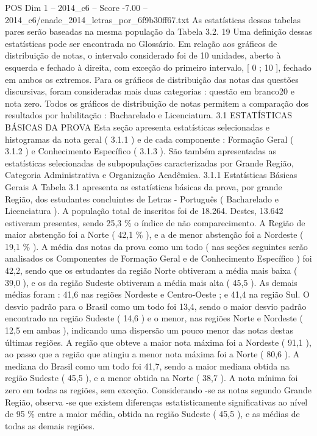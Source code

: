 \begin{textsample}{POS Dim 1 – 2014\_c6 – Score -7.00 – 2014\_c6/enade\_2014\_letras\_por\_6f9b30ff67.txt}
As estatísticas dessas tabelas pares serão baseadas na mesma população da Tabela 3.2. 19 Uma definição dessas estatísticas pode ser encontrada no Glossário.
Em relação aos gráficos de distribuição de notas, o intervalo considerado foi de 10 unidades, aberto à esquerda e fechado à direita, com exceção do primeiro intervalo, [ 0 ; 10 ], fechado em ambos os extremos.
Para os gráficos de distribuição das notas das questões discursivas, foram consideradas mais duas categorias : questão em branco20 e nota zero.
Todos os gráficos de distribuição de notas permitem a comparação dos resultados por habilitação : Bacharelado e Licenciatura. 3.1 ESTATÍSTICAS BÁSICAS DA PROVA Esta seção apresenta estatísticas selecionadas e histogramas da nota geral ( 3.1.1 ) e de cada componente : Formação Geral ( 3.1.2 ) e Conhecimento Específico ( 3.1.3 ).
São também apresentadas as estatísticas selecionadas de subpopulações caracterizadas por Grande Região, Categoria Administrativa e Organização Acadêmica. 3.1.1 Estatísticas Básicas Gerais A Tabela 3.1 apresenta as estatísticas básicas da prova, por grande Região, dos estudantes concluintes de Letras - Português ( Bacharelado e Licenciatura ).
A população total de inscritos foi de 18.264.
Destes, 13.642 estiveram presentes, sendo 25,3 \% o índice de não comparecimento.
A Região de maior abstenção foi a Norte ( 42,1 \% ), e a de menor abstenção foi a Nordeste ( 19,1 \% ).
A média das notas da prova como um todo ( nas seções seguintes serão analisados os Componentes de Formação Geral e de Conhecimento Específico ) foi 42,2, sendo que os estudantes da região Norte obtiveram a média mais baixa ( 39,0 ), e os da região Sudeste obtiveram a média mais alta ( 45,5 ).
As demais médias foram : 41,6 nas regiões Nordeste e Centro-Oeste ; e 41,4 na região Sul.
O desvio padrão para o Brasil como um todo foi 13,4, sendo o maior desvio padrão encontrado na região Sudeste ( 14,6 ) e o menor, nas regiões Norte e Nordeste ( 12,5 em ambas ), indicando uma dispersão um pouco menor das notas destas últimas regiões.
A região que obteve a maior nota máxima foi a Nordeste ( 91,1 ), ao passo que a região que atingiu a menor nota máxima foi a Norte ( 80,6 ).
A mediana do Brasil como um todo foi 41,7, sendo a maior mediana obtida na região Sudeste ( 45,5 ), e a menor obtida na Norte ( 38,7 ).
A nota mínima foi zero em todas as regiões, sem exceção.
Considerando -se as notas segundo Grande Região, observa -se que existem diferenças estatisticamente significativas ao nível de 95 \% entre a maior média, obtida na região Sudeste ( 45,5 ), e as médias de todas as demais regiões.

\end{textsample}
